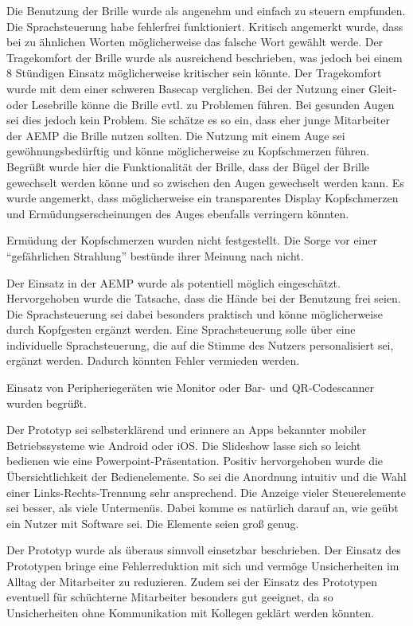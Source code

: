 Die Benutzung der Brille wurde als angenehm und einfach zu steuern empfunden. Die Sprachsteuerung habe fehlerfrei funktioniert. Kritisch angemerkt wurde, dass bei zu ähnlichen Worten möglicherweise das falsche Wort gewählt werde. Der Tragekomfort der Brille wurde als ausreichend beschrieben, was jedoch bei einem 8 Stündigen Einsatz möglicherweise kritischer sein könnte. Der Tragekomfort wurde mit dem einer schweren Basecap verglichen. Bei der Nutzung einer Gleit- oder Lesebrille könne die Brille evtl. zu Problemen führen. Bei gesunden Augen sei dies jedoch kein Problem. Sie schätze es so ein, dass eher junge Mitarbeiter der AEMP die Brille nutzen sollten. Die Nutzung mit einem Auge sei gewöhnungsbedürftig und könne möglicherweise zu Kopfschmerzen führen. Begrüßt wurde hier die Funktionalität der Brille, dass der Bügel der Brille gewechselt werden könne und so zwischen den Augen gewechselt werden kann. Es wurde angemerkt, dass möglicherweise ein transparentes Display Kopfschmerzen und Ermüdungserscheinungen des Auges ebenfalls verringern könnten.

Ermüdung der Kopfschmerzen wurden nicht festgestellt. Die Sorge vor einer \enquote{gefährlichen Strahlung} bestünde ihrer Meinung nach nicht.

Der Einsatz in der AEMP wurde als potentiell möglich eingeschätzt. Hervorgehoben wurde die Tatsache, dass die Hände bei der Benutzung frei seien. Die Sprachsteuerung sei dabei besonders praktisch und könne möglicherweise durch Kopfgesten ergänzt werden. Eine Sprachsteuerung solle über eine individuelle Sprachsteuerung, die auf die Stimme des Nutzers personalisiert sei, ergänzt werden. Dadurch könnten Fehler vermieden werden.

Einsatz von Peripheriegeräten wie Monitor oder Bar- und QR-Codescanner wurden begrüßt.

Der Prototyp sei selbsterklärend und erinnere an Apps bekannter mobiler  Betriebssysteme wie Android oder iOS. Die Slideshow lasse sich so leicht bedienen wie eine Powerpoint-Präsentation. Positiv hervorgehoben wurde die Übersichtlichkeit der Bedienelemente. So sei die Anordnung intuitiv und die Wahl einer Links-Rechts-Trennung sehr ansprechend. Die Anzeige vieler Steuerelemente sei besser, als viele Untermenüs. Dabei komme es natürlich darauf an, wie geübt ein Nutzer mit Software sei. Die Elemente seien groß genug. 

Der Prototyp wurde als überaus sinnvoll einsetzbar beschrieben. Der Einsatz des Prototypen bringe eine Fehlerreduktion mit sich und vermöge Unsicherheiten im Alltag der Mitarbeiter zu reduzieren. Zudem sei der Einsatz des Prototypen eventuell für schüchterne Mitarbeiter besonders gut geeignet, da so Unsicherheiten ohne Kommunikation mit Kollegen geklärt werden könnten.

